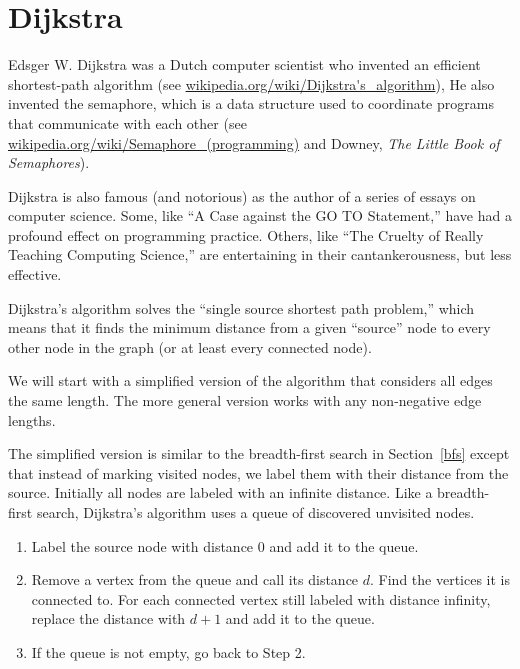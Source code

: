 \documentclass[10pt]{book}
\begin{document}
\section{Dijkstra}

Edsger W. Dijkstra was a Dutch computer scientist who invented an
efficient shortest-path algorithm (see
\url{wikipedia.org/wiki/Dijkstra's_algorithm}), He also invented the
semaphore, which is a data structure used to coordinate programs that
communicate with each other (see
\url{wikipedia.org/wiki/Semaphore_(programming)} and Downey, {\em The
  Little Book of Semaphores}).

Dijkstra is also famous (and notorious) as the author of a series
of essays on computer science.
Some, like ``A Case against the GO TO Statement,'' have
had a profound effect on programming practice.
Others, like
``The Cruelty of Really Teaching Computing Science,'' are
entertaining in their cantankerousness, but less effective.

Dijkstra's algorithm solves the ``single source shortest path problem,''
which means that it finds the minimum distance from a given ``source''
node to every other node in the graph (or at least every connected
node).

We will start with a simplified version of the algorithm that
considers all edges the same length.  The more general version
works with any non-negative edge lengths.

The simplified version is similar to the breadth-first search
in Section~\ref{bfs} except that instead of marking visited nodes,
we label them with their distance from the source.  Initially
all nodes are labeled with an infinite distance.  Like a
breadth-first search, Dijkstra's algorithm uses a queue of
discovered unvisited nodes.

\begin{enumerate}

\item Label the source node with distance 0 and add it to the queue.

\item Remove a vertex from the queue and call its distance $d$.  Find
  the vertices it is connected to.  For each connected vertex still
  labeled with distance infinity, replace the distance with $d+1$ and
  add it to the queue.

\item If the queue is not empty, go back to Step 2.

\end{enumerate}
\end{document}
